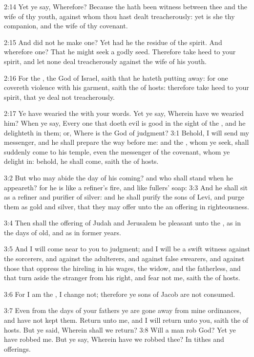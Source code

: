 2:14 Yet ye say, Wherefore? Because the \LORD hath been witness between thee and the wife of thy youth, against whom thou hast dealt treacherously: yet is she thy companion, and the wife of thy covenant.

2:15 And did not he make one? Yet had he the residue of the spirit.  And wherefore one? That he might seek a godly seed. Therefore take heed to your spirit, and let none deal treacherously against the wife of his youth.

2:16 For the \LORD, the God of Israel, saith that he hateth putting away: for one covereth violence with his garment, saith the \LORD of hosts: therefore take heed to your spirit, that ye deal not treacherously.

2:17 Ye have wearied the \LORD with your words. Yet ye say, Wherein have we wearied him? When ye say, Every one that doeth evil is good in the sight of the \LORD, and he delighteth in them; or, Where is the God of judgment?  3:1 Behold, I will send my messenger, and he shall prepare the way before me: and the \LORD, whom ye seek, shall suddenly come to his temple, even the messenger of the covenant, whom ye delight in: behold, he shall come, saith the \LORD of hosts.

3:2 But who may abide the day of his coming? and who shall stand when he appeareth? for he is like a refiner's fire, and like fullers' soap: 3:3 And he shall sit as a refiner and purifier of silver: and he shall purify the sons of Levi, and purge them as gold and silver, that they may offer unto the \LORD an offering in righteousness.

3:4 Then shall the offering of Judah and Jerusalem be pleasant unto the \LORD, as in the days of old, and as in former years.

3:5 And I will come near to you to judgment; and I will be a swift witness against the sorcerers, and against the adulterers, and against false swearers, and against those that oppress the hireling in his wages, the widow, and the fatherless, and that turn aside the stranger from his right, and fear not me, saith the \LORD of hosts.

3:6 For I am the \LORD, I change not; therefore ye sons of Jacob are not consumed.

3:7 Even from the days of your fathers ye are gone away from mine ordinances, and have not kept them. Return unto me, and I will return unto you, saith the \LORD of hosts. But ye said, Wherein shall we return?  3:8 Will a man rob God? Yet ye have robbed me. But ye say, Wherein have we robbed thee? In tithes and offerings.

